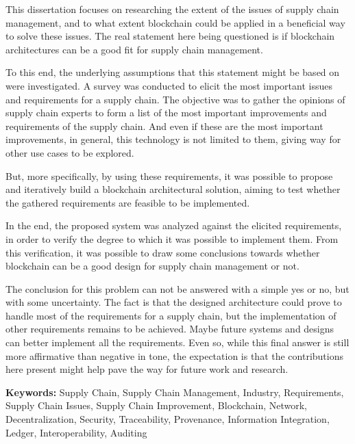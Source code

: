 This dissertation focuses on researching the extent of the issues of supply chain management, and to what extent blockchain could be applied in a beneficial way to solve these issues. The real statement here being questioned is if blockchain architectures can be a good fit for supply chain management.

To this end, the underlying assumptions that this statement might be based on were investigated. A survey was conducted to elicit the most important issues and requirements for a supply chain. The objective was to gather the opinions of supply chain experts to form a list of the most important improvements and requirements of the supply chain. And even if these are the most important improvements, in general, this technology is not limited to them, giving way for other use cases to be explored.

But, more specifically, by using these requirements, it was possible to propose and iteratively build a blockchain architectural solution, aiming to test whether the gathered requirements are feasible to be implemented. 

In the end, the proposed system was analyzed against the elicited requirements, in order to verify the degree to which it was possible to implement them. From this verification, it was possible to draw some conclusions towards whether blockchain can be a good design for supply chain management or not. 

The conclusion for this problem can not be answered with a simple yes or no, but with some uncertainty. The fact is that the designed architecture could prove to handle most of the requirements for a supply chain, but the implementation of other requirements remains to be achieved. Maybe future systems and designs can better implement all the requirements. Even so, while this final answer is still more affirmative than negative in tone, the expectation is that the contributions here present might help pave the way for future work and research.

\textbf{Keywords:} Supply Chain, Supply Chain Management, Industry, Requirements, Supply Chain Issues, Supply Chain Improvement, Blockchain, Network, Decentralization, Security, Traceability, Provenance, Information Integration, Ledger, Interoperability, Auditing






